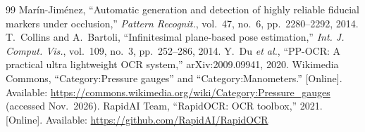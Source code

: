 \documentclass[conference]{IEEEtran}
\begin{document}
\begin{thebibliography}{99}
Mar\'in-Jim\'enez, ``Automatic generation and detection of highly reliable fiducial markers under occlusion,''
\emph{Pattern Recognit.}, vol.~47, no.~6, pp.~2280--2292, 2014.
 T.~Collins and A.~Bartoli, ``Infinitesimal plane-based pose estimation,'' \emph{Int. J.
Comput. Vis.}, vol.~109, no.~3, pp.~252--286, 2014.
 Y.~Du \emph{et al.}, ``PP-OCR: A practical ultra lightweight OCR system,'' arXiv:2009.09941,
2020.
 Wikimedia Commons, ``Category:Pressure gauges'' and ``Category:Manometers.'' [Online]. Available:
\url{https://commons.wikimedia.org/wiki/Category:Pressure_gauges} (accessed Nov.~2026).
 RapidAI Team, ``RapidOCR: OCR toolbox,'' 2021. [Online]. Available:
\url{https://github.com/RapidAI/RapidOCR}
\end{thebibliography}
\end{document}
